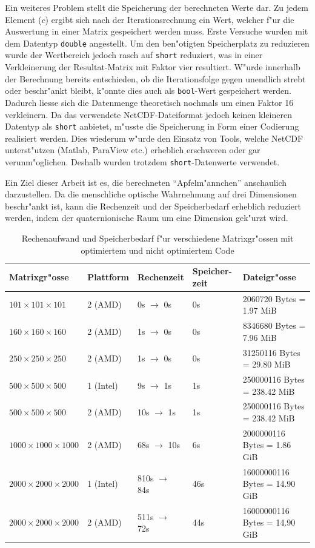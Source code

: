 \begin{refsection}
Ein weiteres Problem stellt die Speicherung der berechneten Werte
dar. Zu jedem Element ($c$) ergibt sich nach der Iterationsrechnung
ein Wert, welcher f"ur die Auswertung in einer Matrix gespeichert
werden muss. Erste Versuche wurden mit dem Datentyp {\tt double}
angestellt. Um den ben"otigten Speicherplatz zu reduzieren wurde
der Wertbereich jedoch rasch auf {\tt short} reduziert, was in einer
Verkleinerung der Resultat-Matrix mit Faktor vier resultiert. W"urde
innerhalb der Berechnung bereits entschieden, ob die Iterationsfolge
gegen unendlich strebt oder beschr"ankt bleibt, k"onnte dies auch als
{\tt bool}-Wert gespeichert werden. Dadurch liesse sich die Datenmenge
theoretisch nochmals um einen Faktor 16 verkleinern. Da das verwendete
NetCDF-Dateiformat jedoch keinen kleineren Datentyp als {\tt short}
anbietet, m"usste die Speicherung in Form einer Codierung realisiert
werden. Dies wiederum w"urde den Einsatz von Tools, welche NetCDF
unterst"utzen (Matlab, ParaView etc.) erheblich erschweren oder gar
verunm"oglichen. Deshalb wurden trotzdem  {\tt short}-Datenwerte
verwendet.

Ein Ziel dieser Arbeit ist es, die berechneten ``Apfelm"annchen''
anschaulich darzustellen. Da die menschliche optische Wahrnehmung auf drei
Dimensionen beschr"ankt ist, kann die Rechenzeit und der Speicherbedarf
erheblich reduziert werden, indem der quaternionische Raum um eine
Dimension gek"urzt wird.

\begin{table}[ht]\centering
	\begin{tabularx}{\textwidth}{|l|l|l|X|l|}
		\hline
		Matrixgr"osse & 	Plattform & Rechenzeit & Speicher-zeit & Dateigr"osse \\ \hline
		$101\times 101\times 101$ & 2 (AMD) & 0s $\to$ 0s  & 0s & 2060720 Bytes = 1.97 MiB \\ \hline
		$160\times 160\times 160$ & 2 (AMD) & 1s $\to$ 0s & 0s & 8346680 Bytes = 7.96 MiB \\ \hline
		$250\times 250\times 250$ & 2 (AMD) & 1s $\to$ 0s & 0s & 31250116 Bytes = 29.80 MiB \\ \hline
		$500\times 500\times 500$ & 1 (Intel) & 9s $\to$ 1s & 1s & 250000116 Bytes = 238.42 MiB \\ \hline
		$500\times 500\times 500$ & 2 (AMD) & 10s $\to$ 1s & 1s & 250000116 Bytes = 238.42 MiB \\ \hline
		$1000\times 1000\times 1000$ & 2 (AMD) & 68s $\to$ 10s & 6s & 2000000116 Bytes = 1.86 GiB \\ \hline
		$2000\times 2000\times 2000$ & 1 (Intel) & 810s $\to$ 84s & 46s & 16000000116 Bytes = 14.90 GiB \\ \hline
		$2000\times 2000\times 2000$ & 2 (AMD) & 511s $\to$ 72s & 44s & 16000000116 Bytes = 14.90 GiB \\ \hline
	\end{tabularx}
	\caption{Rechenaufwand und Speicherbedarf f"ur verschiedene Matrixgr"ossen mit optimiertem und nicht optimiertem Code}
	\label{aufwandstatistik}
\end{table}


\end{refsection}
